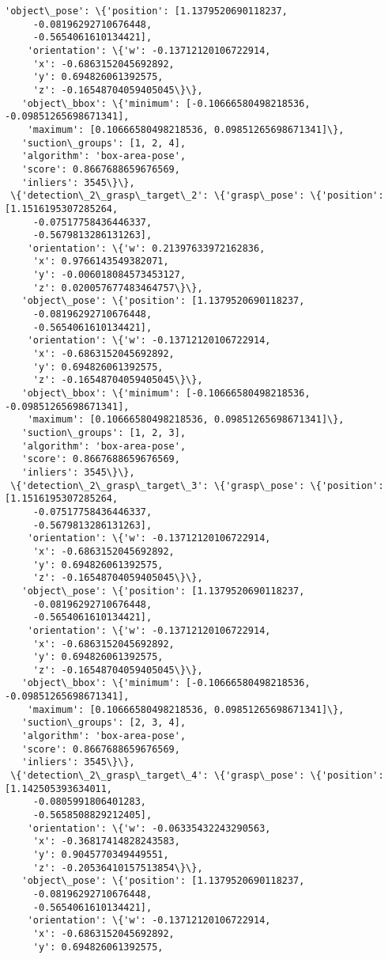 \documentclass[11pt]{article}
\begin{document}
\begin{tcolorbox}[breakable, size=fbox, boxrule=.5pt, pad at break*=1mm, opacityfill=0]
\begin{Verbatim}[commandchars=\\\{\}]
   'object\_pose': \{'position': [1.1379520690118237,
     -0.08196292710676448,
     -0.5654061610134421],
    'orientation': \{'w': -0.13712120106722914,
     'x': -0.6863152045692892,
     'y': 0.694826061392575,
     'z': -0.16548704059405045\}\},
   'object\_bbox': \{'minimum': [-0.10666580498218536, -0.09851265698671341],
    'maximum': [0.10666580498218536, 0.09851265698671341]\},
   'suction\_groups': [1, 2, 4],
   'algorithm': 'box-area-pose',
   'score': 0.8667688659676569,
   'inliers': 3545\}\},
 \{'detection\_2\_grasp\_target\_2': \{'grasp\_pose': \{'position': [1.1516195307285264,
     -0.07517758436446337,
     -0.5679813286131263],
    'orientation': \{'w': 0.21397633972162836,
     'x': 0.9766143549382071,
     'y': -0.006018084573453127,
     'z': 0.020057677483464757\}\},
   'object\_pose': \{'position': [1.1379520690118237,
     -0.08196292710676448,
     -0.5654061610134421],
    'orientation': \{'w': -0.13712120106722914,
     'x': -0.6863152045692892,
     'y': 0.694826061392575,
     'z': -0.16548704059405045\}\},
   'object\_bbox': \{'minimum': [-0.10666580498218536, -0.09851265698671341],
    'maximum': [0.10666580498218536, 0.09851265698671341]\},
   'suction\_groups': [1, 2, 3],
   'algorithm': 'box-area-pose',
   'score': 0.8667688659676569,
   'inliers': 3545\}\},
 \{'detection\_2\_grasp\_target\_3': \{'grasp\_pose': \{'position': [1.1516195307285264,
     -0.07517758436446337,
     -0.5679813286131263],
    'orientation': \{'w': -0.13712120106722914,
     'x': -0.6863152045692892,
     'y': 0.694826061392575,
     'z': -0.16548704059405045\}\},
   'object\_pose': \{'position': [1.1379520690118237,
     -0.08196292710676448,
     -0.5654061610134421],
    'orientation': \{'w': -0.13712120106722914,
     'x': -0.6863152045692892,
     'y': 0.694826061392575,
     'z': -0.16548704059405045\}\},
   'object\_bbox': \{'minimum': [-0.10666580498218536, -0.09851265698671341],
    'maximum': [0.10666580498218536, 0.09851265698671341]\},
   'suction\_groups': [2, 3, 4],
   'algorithm': 'box-area-pose',
   'score': 0.8667688659676569,
   'inliers': 3545\}\},
 \{'detection\_2\_grasp\_target\_4': \{'grasp\_pose': \{'position': [1.142505393634011,
     -0.0805991806401283,
     -0.5658508829212405],
    'orientation': \{'w': -0.06335432243290563,
     'x': -0.36817414828243583,
     'y': 0.9045770349449551,
     'z': -0.20536410157513854\}\},
   'object\_pose': \{'position': [1.1379520690118237,
     -0.08196292710676448,
     -0.5654061610134421],
    'orientation': \{'w': -0.13712120106722914,
     'x': -0.6863152045692892,
     'y': 0.694826061392575,

\end{Verbatim}
\end{tcolorbox}
\end{document}
